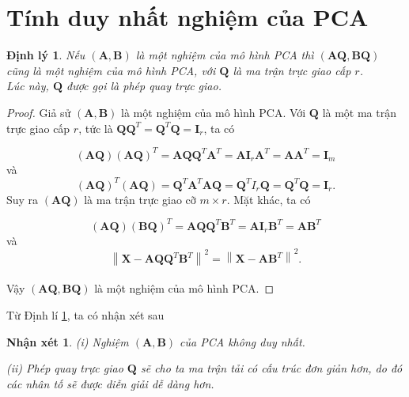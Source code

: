 \documentclass[12pt,a4paper,oneside]{report}
\newtheorem{nx}{Nhận xét}[section]
\newtheorem{dl}{Định lý}[section]
\numberwithin{equation}{section}
\begin{document}
\section{Tính duy nhất nghiệm của PCA}
\begin{dl} \label{dl351}
Nếu $(\mathbf{A, B})$ là một nghiệm của mô hình PCA thì $(\mathbf{A Q, B Q})$ cũng là một nghiệm của mô hình PCA, với $\mathbf{Q}$ là ma trận trực giao cấp $r$.\\
Lúc này, $\mathbf{Q}$ được gọi là phép quay trực giao.
\end{dl}
\begin{proof}
Giả sử $(\mathbf{A, B})$ là một nghiệm của mô hình PCA.
Với $\mathbf{Q}$ là một ma trận trực giao cấp $r$, tức là $\mathbf{Q Q}^{T}=\mathbf{Q}^{T} \mathbf{Q}=\mathbf{I}_{r}$, ta có

$$
(\mathbf{A Q})(\mathbf{A Q})^{T}=\mathbf{A Q Q}^{T} \mathbf{A}^{T}=\mathbf{AI}_{r} \mathbf{A}^{T}=\mathbf{A A}^{T}=\mathbf{I}_{m}
$$
và
$$
(\mathbf{A Q})^{T}(\mathbf{A Q})=\mathbf{Q}^{T} \mathbf{A}^{T} \mathbf{A Q}=\mathbf{Q}^{T} I_{r} \mathbf{Q}=\mathbf{Q}^{T} \mathbf{Q}=\mathbf{I}_{r}.
$$
Suy ra $(\mathbf{A Q})$ là ma trận trực giao cỡ $m \times r$.
Mặt khác, ta có

$$
(\mathbf{A Q})(\mathbf{B Q})^{T}=\mathbf{A Q Q}^{T} \mathbf{B}^{T}=\mathbf{A I}_{r} \mathbf{B}^{T}=\mathbf{A B}^{T}
$$
và
$$
\left\|\mathbf{X-A Q Q}^{T} \mathbf{B}^{T}\right\|^{2}=\left\|\mathbf{X-A B}^{T}\right\|^{2}.
$$\\
Vậy $(\mathbf{A Q, B Q})$ là một nghiệm của mô hình PCA.
\end{proof}
Từ Định lí \ref{dl351}, ta có nhận xét sau\\
\begin{nx} 
\item[(i)] Nghiệm $(\mathbf{A, B})$ của PCA không duy nhất.
\item[(ii)] Phép quay trực giao $\mathbf{Q}$ sẽ cho ta ma trận tải có cấu trúc đơn giản hơn, do đó các nhân tố sẽ được diễn giải dễ dàng hơn.
\end{nx}
\end{document}
